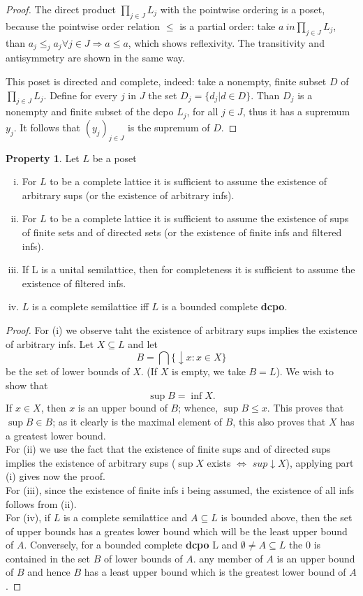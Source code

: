 \documentclass[a4paper,12pt]{article}
\theoremstyle{definition}
\newtheorem{property}[theorem]{Property}
\begin{document}
\begin{proof}
The direct product  $\prod_{j\in J}L_j$  with the pointwise ordering is a poset, because the pointwise order relation $\leq$ is a partial order: take $a \ in \prod_{j\in J}L_j$, than $a_j \leq_j a_j \forall j \in J \Rightarrow a \leq a$, which shows reflexivity. The transitivity and antisymmetry are shown in the same way.

This poset is directed and complete, indeed: take a nonempty, finite subset $D$ of  $\prod_{j\in J}L_j$. Define for every $j$ in $J$ the set $D_j = \{d_j | d \in D\}$. Than $D_j$ is a nonempty and finite subset of the dcpo $L_j$, for all $j \in J$, thus it has a supremum $y_j$. It follows that $(y_j)_{j\in J}$ is the supremum of $D$.
\end{proof}

\begin{property}
Let $L$ be a poset
\begin{enumerate}[(i)]
  \item For $L$ to be a complete lattice it is sufficient to assume the existence of arbitrary sups (or the existence of arbitrary infs).
  \item For $L$ to be a complete lattice it is sufficient to assume the existence of sups of finite sets and of directed sets (or the existence of finite infs and filtered infs).
  \item If L is a unital semilattice, then for completeness it is sufficient to assume the existence of filtered infs.
  \item $L$ is a complete semilattice iff $L$ is a bounded complete \textbf{dcpo}.
\end{enumerate}
\end{property}

\begin{proof}
For (i) we observe taht the existence of arbitrary sups implies the existence of arbitrary infs. Let $X \subseteq L$ and let
$$B = \bigcap\{\downarrow x: x \in X \}$$
be the set of lower bounds of $X$. (If $X$ is empty, we take $B = L$). We wish to show that
$$\sup B = \inf X.$$
If $x \in X$, then $x$ is an upper bound of $B$; whence, $\sup B \leq x$. This proves that $\sup B \in B$; as it clearly is the maximal element of $B$, this also proves that $X$ has a greatest lower bound.\\
For (ii) we use the fact that the existence of finite sups and of directed sups implies the existence of arbitrary sups ($\sup X$ exists $\Leftrightarrow$ $sup \downarrow X$), applying part (i) gives now the proof.\\
For (iii), since the existence of finite infs i being assumed, the existence of all infs follows from (ii).\\
For (iv), if $L$ is a complete semilattice and $A \subseteq L$ is bounded above, then the set of upper bounds has a greates lower bound which will be the least upper bound of $A$. Conversely, for a bounded complete \textbf{dcpo} L and $\emptyset \neq A \subseteq L$ the $0$ is contained in the set $B$ of lower bounds of $A$. any member of $A$ is an upper bound of $B$ and hence $B$ has a least upper bound which is the greatest lower bound of $A$.
\end{proof}
\end{document}
